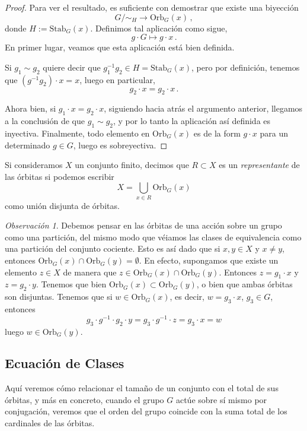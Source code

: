 \documentclass[a4paper,11pt]{amsart}
\theoremstyle{plain}
\theoremstyle{definition}
\theoremstyle{remark}
\newtheorem*{rem}{Observación}
\begin{document}
\begin{proof}
Para ver el resultado, es suficiente con demostrar que existe una biyección 
\[ G/\sim_{H} \to \text{Orb}_G(x) \, ,\]
donde $H := \text{Stab}_G(x)$. Definimos tal aplicación como sigue, 
\[ g \cdot G \mapsto g \cdot x \, . \]
En primer lugar, veamos que esta aplicación está bien definida. 

Si $g_1 \sim g_2$ quiere decir que $g_1^{-1} g_2 \in H = \text{Stab}_G(x)$, pero por definición, tenemos que $(g^{-1} g_2) \cdot x = x$, luego en particular, 
\[ g_2 \cdot x = g_2 \cdot x \, .\]

Ahora bien, si $g_1 \cdot x = g_2 \cdot x$, siguiendo hacia atrás el argumento anterior, llegamos a la conclusión de que $g_1 \sim g_2$, y por lo tanto la aplicación así definida es inyectiva. Finalmente, todo elemento en $\text{Orb}_G(x)$ es de la form $g \cdot x$ para un determinado $g \in G$, luego es sobreyectiva. 
\end{proof}

Si consideramos $X$ un conjunto finito, decimos que $R \subset X$ es un \textit{representante} de las órbitas si podemos escribir 
\[ X = \bigcup_{x \in R} \text{Orb}_G(x) \]
como unión disjunta de órbitas. 

\begin{rem}
Debemos pensar en las órbitas de una acción sobre un grupo como una partición, del mismo modo que véiamos las clases de equivalencia como una partición del conjunto cociente. Esto es así dado que si $x, y \in X$ y $x \neq y$, entonces $\text{Orb}_G(x) \cap \text{Orb}_G(y) = \emptyset$. En efecto, supongamos que existe un elemento $z \in X$ de manera que $z \in \text{Orb}_G(x) \cap \text{Orb}_G(y) $. Entonces $z = g_1 \cdot x$ y $z = g_2 \cdot y$. Tenemos que bien $\text{Orb}_G(x) \subset \text{Orb}_G(y)$, o bien que ambas órbitas son disjuntas. Tenemos que si $w \in \text{Orb}_G(x)$, es decir, $w = g_3 \cdot x$, $g_3 \in G$, entonces 
\[g_3 \cdot g^{-1} \cdot g_2 \cdot y = g_3 \cdot g^{-1} \cdot z = g_3 \cdot x = w \]
luego $w \in \text{Orb}_G(y)$.
\end{rem}
\subsection{Ecuación de Clases}

Aquí veremos cómo relacionar el tamaño de un conjunto con el total de sus órbitas, y más en concreto, cuando el grupo $G$ actúe sobre sí mismo por conjugación, veremos que el orden del grupo coincide con la suma total de los cardinales de las órbitas.
\end{document}
